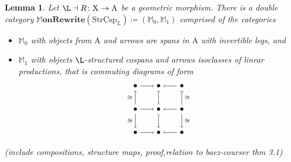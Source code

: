 \documentclass{amsart}
\newcommand{\iso}{\cong}
\newcommand{\A}{\cat{A}}
\newcommand{\X}{\cat{X}}
\newcommand{\MMM}{\dblcat{M}}
\newcommand{\StrCsp}{\cat{StrCsp}}
\newcommand{\MMMonRewrite}{\dblcat{M}\bicat{onRewrite}}
\newcommand{\cat}[1]{\mathrm{#1}}
\newcommand{\bicat}[1]{\mathbf{#1}}
\newcommand{\dblcat}[1]{\mathbb{#1}}
\newcommand{\edit}[1]{\textcolor{editcolour}{(#1)}}
\newcommand{\from}{\colon}
\newtheorem{lemma}[theorem]{Lemma}
\theoremstyle{remark}
\theoremstyle{definition}
\begin{document}
\begin{lemma}

  Let $ \L \dashv R \from \X \to \A $ be a geometric morphism.  There
  is a double category
  \(
    \MMMonRewrite ( \StrCsp_L ) \coloneqq ( \MMM_0 , \MMM_1 )
  \)
  comprised of the categories
  \begin{itemize}
  \item $ \MMM_0 $ with objects from $ \A $ and arrows are spans in $
    \A $ with invertible legs, and
  \item $ \MMM_1 $ with objects $ \L $-structured cospans and arrows
    isoclasses of linear productions, that is commuting diagrams of
    form
    \[
      \begin{tikzpicture}
        \node (1) at (0,2) {\( \bullet \)};
        \node (2) at (1,2) {\( \bullet \)};
        \node (3) at (2,2) {\( \bullet \)};
        \node (4) at (0,1) {\( \bullet \)};
        \node (5) at (1,1) {\( \bullet \)};
        \node (6) at (2,1) {\( \bullet \)};
        \node (7) at (0,0) {\( \bullet \)};
        \node (8) at (1,0) {\( \bullet \)};
        \node (9) at (2,0) {\( \bullet \)};
        \draw [->] (1) to node [] {\scriptsize{\(  \)}} (2);
        \draw [->] (3) to node [] {\scriptsize{\(  \)}} (2);
        \draw [->] (4) to node [] {\scriptsize{\(  \)}} (5);
        \draw [->] (6) to node [] {\scriptsize{\(  \)}} (5);
        \draw [->] (7) to node [] {\scriptsize{\(  \)}} (8);
        \draw [->] (9) to node [] {\scriptsize{\(  \)}} (8);
        \draw [->] (4) to node [left] {\scriptsize{\( \iso \)}} (1);
        \draw [->] (4) to node [left] {\scriptsize{\( \iso \)}} (7);
        \draw [>->] (5) to node [] {\scriptsize{\(  \)}} (2);
        \draw [>->] (5) to node [] {\scriptsize{\(  \)}} (8);
        \draw [->] (6) to node [right] {\scriptsize{\( \iso \)}} (3);
        \draw [->] (6) to node [right] {\scriptsize{\( \iso \)}} (9);
      \end{tikzpicture}
    \]
    
  \end{itemize}

  \edit{include compositions, structure maps, proof,relation to
    baez-courser thm 3.1}
  
\end{lemma}
\end{document}
